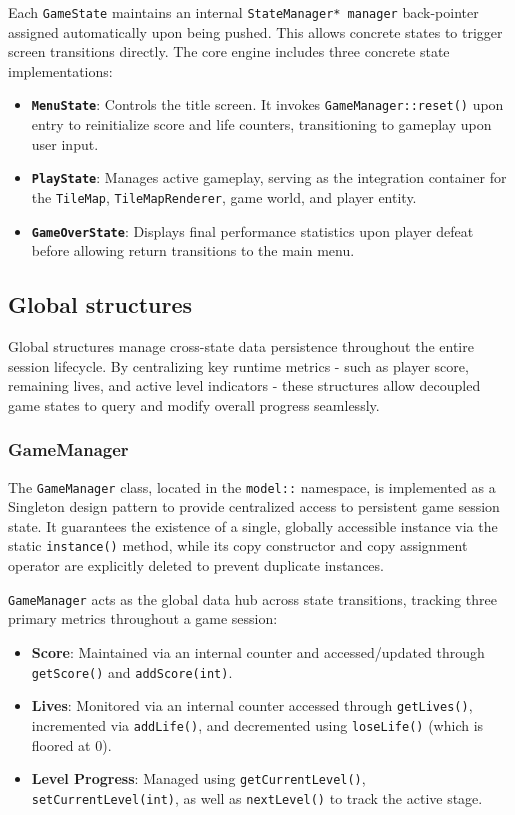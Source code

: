 \documentclass[12pt, a4paper]{article}
\begin{document}
Each \texttt{GameState} maintains an internal \texttt{StateManager* manager} back-pointer assigned automatically upon being pushed. This allows concrete states to trigger screen transitions directly. The core engine includes three concrete state implementations:
\begin{itemize}
\item \textbf{\texttt{MenuState}}: Controls the title screen. It invokes \texttt{GameManager::reset()} upon entry to reinitialize score and life counters, transitioning to gameplay upon user input.
\item \textbf{\texttt{PlayState}}: Manages active gameplay, serving as the integration container for the \texttt{TileMap}, \texttt{TileMapRenderer}, game world, and player entity.
\item \textbf{\texttt{GameOverState}}: Displays final performance statistics upon player defeat before allowing return transitions to the main menu.
\end{itemize}

\subsection{Global structures}

Global structures manage cross-state data persistence throughout the entire session lifecycle. By centralizing key runtime metrics - such as player score, remaining lives, and active level indicators - these structures allow decoupled game states to query and modify overall progress seamlessly.

\subsubsection{GameManager}

The \texttt{GameManager} class, located in the \texttt{model::} namespace, is implemented as a Singleton design pattern to provide centralized access to persistent game session state. It guarantees the existence of a single, globally accessible instance via the static \texttt{instance()} method, while its copy constructor and copy assignment operator are explicitly deleted to prevent duplicate instances.

\texttt{GameManager} acts as the global data hub across state transitions, tracking three primary metrics throughout a game session:
\begin{itemize}
\item \textbf{Score}: Maintained via an internal counter and accessed/updated through \texttt{getScore()} and \texttt{addScore(int)}.
\item \textbf{Lives}: Monitored via an internal counter accessed through \texttt{getLives()}, incremented via \texttt{addLife()}, and decremented using \texttt{loseLife()} (which is floored at 0).
\item \textbf{Level Progress}: Managed using \texttt{getCurrentLevel()}, \texttt{setCurrentLevel(int)}, as well as \texttt{nextLevel()} to track the active stage.
\end{itemize}
\end{document}
